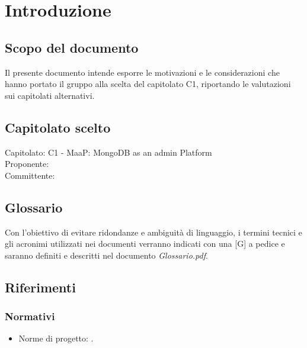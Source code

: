 \section{Introduzione}

\subsection{Scopo del documento}
Il presente documento intende esporre le motivazioni e le considerazioni che hanno portato il gruppo alla scelta del capitolato C1, riportando le valutazioni sui capitolati alternativi.

\subsection{Capitolato scelto}
Capitolato: C1 - MaaP: MongoDB as an admin Platform\\
Proponente: \Proponente{} \\
Committente: \Committente{} \\

\subsection{Glossario}
Con l'obiettivo di evitare ridondanze e ambiguità di linguaggio, i termini tecnici e gli acronimi utilizzati nei documenti verranno indicati con una [G] a pedice e saranno definiti e descritti  nel documento \emph{Glossario.pdf}. 

\subsection{Riferimenti}

	\subsubsection{Normativi}
	\begin{itemize}
		\item Norme di progetto: \NormeDiProgetto .
	\end{itemize}

